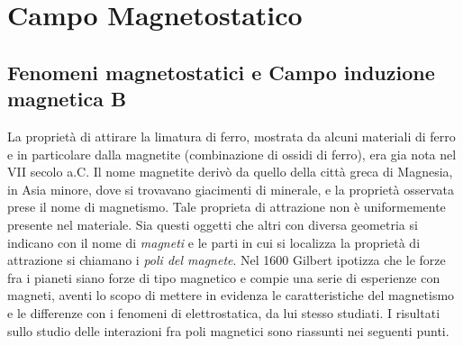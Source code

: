 \chapter{Campo Magnetostatico}

\section{Fenomeni magnetostatici e Campo induzione magnetica B}

La proprietà di attirare la limatura di ferro, mostrata da alcuni materiali di ferro e in particolare dalla magnetite (combinazione di ossidi di ferro), era gia nota nel VII secolo a.C. Il nome magnetite derivò da quello della città greca di Magnesia, in Asia minore, dove si trovavano giacimenti di minerale, e la proprietà osservata prese il nome di magnetismo.
Tale proprieta di attrazione non è uniformemente presente nel materiale. Sia questi oggetti che altri con diversa geometria si indicano con il nome di \emph{magneti} e le parti in cui si localizza la proprietà di attrazione si chiamano i \emph{poli del magnete}.
Nel 1600 Gilbert ipotizza che le forze fra i pianeti siano forze di tipo magnetico e compie una serie di esperienze con magneti, aventi lo scopo di mettere in evidenza le caratteristiche del magnetismo e le differenze con i fenomeni di elettrostatica, da lui stesso studiati. I risultati sullo studio delle interazioni fra poli magnetici sono riassunti nei seguenti punti.

